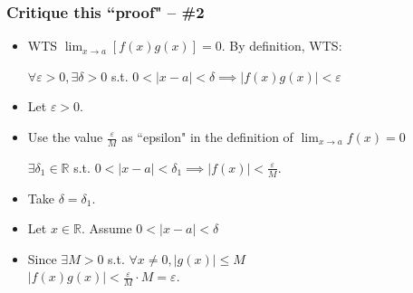 \documentclass[14pt]{beamer}
\begin{document}
	\begin{frame}[t]
		\frametitle{Critique this ``proof" -- \#2}
		\fontsize{13}{13}\selectfont
		\begin{itemize}
			\item WTS $\displaystyle \lim_{x \to a}\left[f(x) g(x) \right] =0$. By
				definition, WTS:

				\hfill $\displaystyle \forall \varepsilon>0, \exists \delta>0$ s.t.
				$\displaystyle 0<|x-a|<\delta \implies |f(x) g(x)|<\varepsilon$
				\vfill

			\item Let $\varepsilon >0$.
				\vfill

			\item Use the value $\displaystyle \frac{\varepsilon}{M}$ as ``epsilon" in
				the definition of $\displaystyle \lim_{x \to a}f(x) = 0$

				\hfill $\displaystyle \exists \delta_{1}\in \mathbb{R}$ s.t.
				$\displaystyle 0<|x-a|<\delta_{1}\implies |f(x)| < \frac{\varepsilon}{M}$.
				\vfill

			\item Take $\displaystyle \delta = \delta_{1}$.
				\vfill

			\item Let $\displaystyle x \in \mathbb{R}$. Assume
				$\displaystyle 0 < |x-a| <\delta$
				\vfill

			\item Since $\displaystyle \exists M>0$ s.t.
				$\displaystyle \forall x \neq 0, |g(x)| \leq M$ \\ \hfill
				$\displaystyle |f(x) g(x)| < \frac{\varepsilon}{M}\cdot M = \varepsilon$.
				\vfill
		\end{itemize}
	\end{frame}

\end{document}
